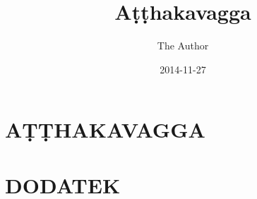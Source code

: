 \documentclass[
  final,
  pagePreset=tallpage,
  babelLanguage=slovene,
]{anecdote}
\title{Aṭṭhakavagga}
\subtitle{}
\author{The Author}
\date{2014-11-27}
\begin{document}
\frontmatter





\cleartorecto
\tableofcontents*



\mainmatter


\cleartorecto
\part{AṬṬHAKAVAGGA}

%


















\appendix

\cleartorecto

\part{DODATEK}

%




%

%

\newpage\thispagestyle{empty}\mbox{}
\end{document}
